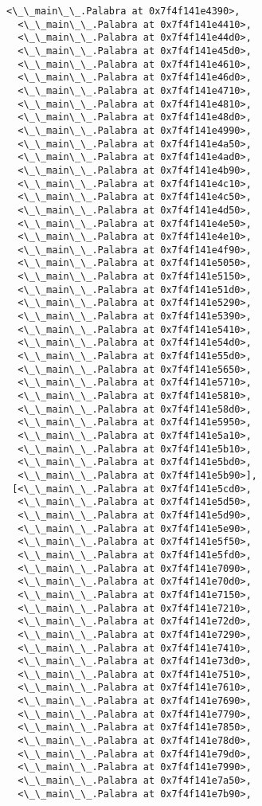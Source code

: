 \documentclass[12pt,a4paper,table]{article}
\begin{document}
\begin{tcolorbox}[breakable, size=fbox, boxrule=.5pt, pad at break*=1mm, opacityfill=0]
\begin{Verbatim}[commandchars=\\\{\}]
  <\_\_main\_\_.Palabra at 0x7f4f141e4390>,
  <\_\_main\_\_.Palabra at 0x7f4f141e4410>,
  <\_\_main\_\_.Palabra at 0x7f4f141e44d0>,
  <\_\_main\_\_.Palabra at 0x7f4f141e45d0>,
  <\_\_main\_\_.Palabra at 0x7f4f141e4610>,
  <\_\_main\_\_.Palabra at 0x7f4f141e46d0>,
  <\_\_main\_\_.Palabra at 0x7f4f141e4710>,
  <\_\_main\_\_.Palabra at 0x7f4f141e4810>,
  <\_\_main\_\_.Palabra at 0x7f4f141e48d0>,
  <\_\_main\_\_.Palabra at 0x7f4f141e4990>,
  <\_\_main\_\_.Palabra at 0x7f4f141e4a50>,
  <\_\_main\_\_.Palabra at 0x7f4f141e4ad0>,
  <\_\_main\_\_.Palabra at 0x7f4f141e4b90>,
  <\_\_main\_\_.Palabra at 0x7f4f141e4c10>,
  <\_\_main\_\_.Palabra at 0x7f4f141e4c50>,
  <\_\_main\_\_.Palabra at 0x7f4f141e4d50>,
  <\_\_main\_\_.Palabra at 0x7f4f141e4e50>,
  <\_\_main\_\_.Palabra at 0x7f4f141e4e10>,
  <\_\_main\_\_.Palabra at 0x7f4f141e4f90>,
  <\_\_main\_\_.Palabra at 0x7f4f141e5050>,
  <\_\_main\_\_.Palabra at 0x7f4f141e5150>,
  <\_\_main\_\_.Palabra at 0x7f4f141e51d0>,
  <\_\_main\_\_.Palabra at 0x7f4f141e5290>,
  <\_\_main\_\_.Palabra at 0x7f4f141e5390>,
  <\_\_main\_\_.Palabra at 0x7f4f141e5410>,
  <\_\_main\_\_.Palabra at 0x7f4f141e54d0>,
  <\_\_main\_\_.Palabra at 0x7f4f141e55d0>,
  <\_\_main\_\_.Palabra at 0x7f4f141e5650>,
  <\_\_main\_\_.Palabra at 0x7f4f141e5710>,
  <\_\_main\_\_.Palabra at 0x7f4f141e5810>,
  <\_\_main\_\_.Palabra at 0x7f4f141e58d0>,
  <\_\_main\_\_.Palabra at 0x7f4f141e5950>,
  <\_\_main\_\_.Palabra at 0x7f4f141e5a10>,
  <\_\_main\_\_.Palabra at 0x7f4f141e5b10>,
  <\_\_main\_\_.Palabra at 0x7f4f141e5bd0>,
  <\_\_main\_\_.Palabra at 0x7f4f141e5b90>],
 [<\_\_main\_\_.Palabra at 0x7f4f141e5cd0>,
  <\_\_main\_\_.Palabra at 0x7f4f141e5d50>,
  <\_\_main\_\_.Palabra at 0x7f4f141e5d90>,
  <\_\_main\_\_.Palabra at 0x7f4f141e5e90>,
  <\_\_main\_\_.Palabra at 0x7f4f141e5f50>,
  <\_\_main\_\_.Palabra at 0x7f4f141e5fd0>,
  <\_\_main\_\_.Palabra at 0x7f4f141e7090>,
  <\_\_main\_\_.Palabra at 0x7f4f141e70d0>,
  <\_\_main\_\_.Palabra at 0x7f4f141e7150>,
  <\_\_main\_\_.Palabra at 0x7f4f141e7210>,
  <\_\_main\_\_.Palabra at 0x7f4f141e72d0>,
  <\_\_main\_\_.Palabra at 0x7f4f141e7290>,
  <\_\_main\_\_.Palabra at 0x7f4f141e7410>,
  <\_\_main\_\_.Palabra at 0x7f4f141e73d0>,
  <\_\_main\_\_.Palabra at 0x7f4f141e7510>,
  <\_\_main\_\_.Palabra at 0x7f4f141e7610>,
  <\_\_main\_\_.Palabra at 0x7f4f141e7690>,
  <\_\_main\_\_.Palabra at 0x7f4f141e7790>,
  <\_\_main\_\_.Palabra at 0x7f4f141e7850>,
  <\_\_main\_\_.Palabra at 0x7f4f141e78d0>,
  <\_\_main\_\_.Palabra at 0x7f4f141e79d0>,
  <\_\_main\_\_.Palabra at 0x7f4f141e7990>,
  <\_\_main\_\_.Palabra at 0x7f4f141e7a50>,
  <\_\_main\_\_.Palabra at 0x7f4f141e7b90>,

\end{Verbatim}
\end{tcolorbox}
\end{document}
